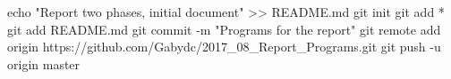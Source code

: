 echo "Report two phases, initial document" >> README.md
git init
git add *
git add README.md
git commit -m "Programs for the report"
git remote add origin https://github.com/Gabydc/2017_08_Report_Programs.git
git push -u origin master
